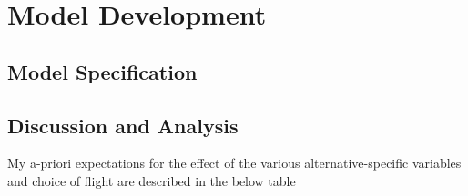 \section{Model Development}
\subsection{Model Specification}
\subsection{Discussion and Analysis}
My a-priori expectations for the effect of the various alternative-specific variables and choice of flight are described in the below table